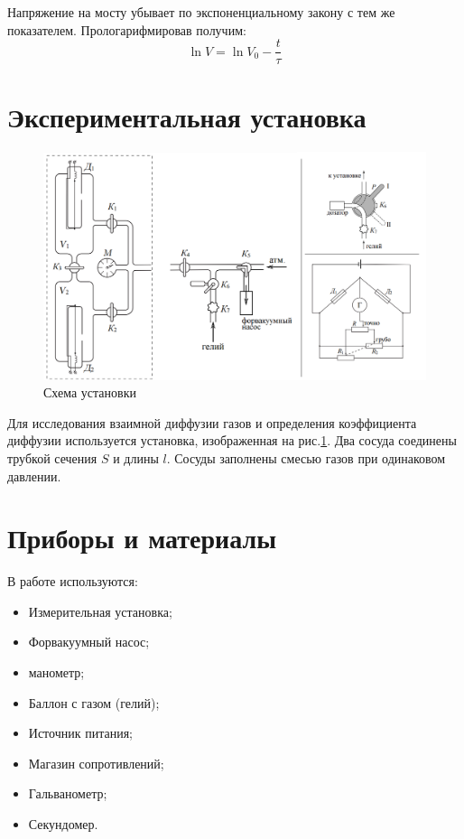 \documentclass[12pt]{article}
\begin{document}
Напряжение на мосту убывает по экспоненциальному закону с тем же показателем. Прологарифмировав получим:
\begin{equation}
	\ln{V} = \ln{V_0} - \frac{t}{\tau}
	\label{eq:main}
\end{equation} 

\section{Экспериментальная установка}

\begin{figure}[H]
	\centering
	\includegraphics[scale = 0.5]{./images/stand.png}
	\caption{Схема установки}
	\label{fig:stand}
\end{figure}
Для исследования взаимной диффузии газов  и определения коэффициента диффузии используется установка, изображенная на рис.\ref{fig:stand}. Два сосуда соединены трубкой сечения $S$ и  длины $l$. Сосуды заполнены смесью газов при одинаковом давлении.

\section{Приборы и материалы}

В работе используются:

\begin{itemize}
	\item Измерительная установка;
	\item Форвакуумный насос;
	\item манометр;
	\item Баллон с газом (гелий);
	\item Источник питания;
	\item Магазин сопротивлений;
	\item Гальванометр;
	\item Секундомер.
\end{itemize}
\end{document}
